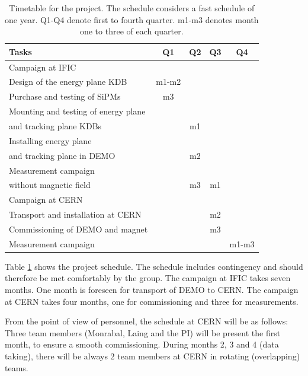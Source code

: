 \begin{table}[h!]
\begin{center}
\begin{tabular}{| l | c | c | c | c |}
\hline
Tasks & Q1 & Q2 & Q3 & Q4  \\
\hline
Campaign at IFIC & & & &   \\
\hline
Design of the energy plane KDB & m1-m2 & & &   \\
Purchase and testing of SiPMs  & m3 & & &  \\
Mounting and testing of energy plane & & & &  \\
and tracking plane KDBs & & m1  & &  \\
Installing energy plane & & & &  \\
and tracking plane in DEMO & & m2 & & \\
Measurement campaign  & & & & \\
without magnetic field & & m3 & m1 & \\
\hline
Campaign at CERN & & & &   \\
\hline
Transport and installation at CERN & & & m2 &  \\
Commissioning of DEMO and magnet & & & m3 & \\
Measurement campaign & & & & m1-m3 \\
\hline
\end{tabular}
\caption{Timetable for the project. The schedule considers a fast schedule of one year.
Q1-Q4 denote first to fourth quarter. m1-m3 denotes month one to three of each quarter.}
\label{tab:schedule}
\end{center}
\end{table}

Table \ref{tab:schedule} shows the project schedule. The schedule includes contingency and should therefore be met comfortably by the group. The campaign at IFIC takes seven months. One month is foreseen for transport of DEMO to CERN. The campaign at CERN takes four months, one for commissioning and three for measurements. 

From the point of view of personnel, the schedule at CERN will be as follows: Three team members (Monrabal, Laing and the PI) will be present the first month, to ensure a smooth commissioning. During months 2, 3 and 4 (data taking), there will be always 2 team members at CERN in rotating (overlapping) teams. 

